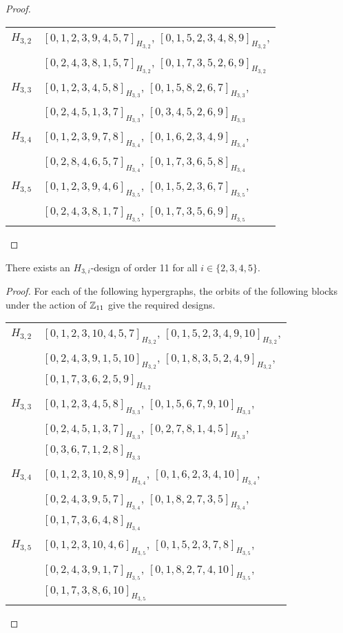 \begin{subappendices}
\begin{proof}
\begin{tabular}{|c|l|}
\hline
$H_{3,2}$ &
  $[0, 1, 2, 3, 9, 4, 5, 7]_{H_{3,2}}$,
  $[0, 1, 5, 2, 3, 4, 8, 9]_{H_{3,2}}$, \\ &
  $[0, 2, 4, 3, 8, 1, 5, 7]_{H_{3,2}}$,
  $[0, 1, 7, 3, 5, 2, 6, 9]_{H_{3,2}}$
\\ \hline
$H_{3,3}$ &
  $[0, 1, 2, 3, 4, 5, 8]_{H_{3,3}}$,
  $[0, 1, 5, 8, 2, 6, 7]_{H_{3,3}}$, \\ &
  $[0, 2, 4, 5, 1, 3, 7]_{H_{3,3}}$,
  $[0, 3, 4, 5, 2, 6, 9]_{H_{3,3}}$
\\ \hline
$H_{3,4}$ &
  $[0, 1, 2, 3, 9, 7, 8]_{H_{3,4}}$,
  $[0, 1, 6, 2, 3, 4, 9]_{H_{3,4}}$, \\ &
  $[0, 2, 8, 4, 6, 5, 7]_{H_{3,4}}$,
  $[0, 1, 7, 3, 6, 5, 8]_{H_{3,4}}$
\\ \hline
$H_{3,5}$ &
  $[0, 1, 2, 3, 9, 4, 6]_{H_{3,5}}$,
  $[0, 1, 5, 2, 3, 6, 7]_{H_{3,5}}$, \\ &
  $[0, 2, 4, 3, 8, 1, 7]_{H_{3,5}}$,
  $[0, 1, 7, 3, 5, 6, 9]_{H_{3,5}}$
\\ \hline
\end{tabular}
\end{proof}


\begin{example} \label{eg:H_3i-11}
There exists an $H_{3,i}$-design of order 11 for all $i \in \{2,3,4,5\}$.
\end{example}

\begin{proof}
For each of the following hypergraphs, the orbits of the following blocks under
the action of $\mathbb{Z}_{11}$ give the required designs.

\begin{tabular}{|c|l|}
\hline
$H_{3,2}$ &
  $[0, 1, 2, 3, 10, 4, 5, 7]_{H_{3,2}}$,
  $[0, 1, 5, 2, 3, 4, 9, 10]_{H_{3,2}}$, \\ &
  $[0, 2, 4, 3, 9, 1, 5, 10]_{H_{3,2}}$,
  $[0, 1, 8, 3, 5, 2, 4, 9]_{H_{3,2}}$, \\ &
  $[0, 1, 7, 3, 6, 2, 5, 9]_{H_{3,2}}$
\\ \hline
$H_{3,3}$ &
  $[0, 1, 2, 3, 4, 5, 8]_{H_{3,3}}$,
  $[0, 1, 5, 6, 7, 9, 10]_{H_{3,3}}$, \\ &
  $[0, 2, 4, 5, 1, 3, 7]_{H_{3,3}}$,
  $[0, 2, 7, 8, 1, 4, 5]_{H_{3,3}}$, \\ &
  $[0, 3, 6, 7, 1, 2, 8]_{H_{3,3}}$
\\ \hline
$H_{3,4}$ &
  $[0, 1, 2, 3, 10, 8, 9]_{H_{3,4}}$,
  $[0, 1, 6, 2, 3, 4, 10]_{H_{3,4}}$, \\ &
  $[0, 2, 4, 3, 9, 5, 7]_{H_{3,4}}$,
  $[0, 1, 8, 2, 7, 3, 5]_{H_{3,4}}$, \\ &
  $[0, 1, 7, 3, 6, 4, 8]_{H_{3,4}}$
\\ \hline
$H_{3,5}$ &
  $[0, 1, 2, 3, 10, 4, 6]_{H_{3,5}}$,
  $[0, 1, 5, 2, 3, 7, 8]_{H_{3,5}}$, \\ &
  $[0, 2, 4, 3, 9, 1, 7]_{H_{3,5}}$,
  $[0, 1, 8, 2, 7, 4, 10]_{H_{3,5}}$, \\ &
  $[0, 1, 7, 3, 8, 6, 10]_{H_{3,5}}$
\\ \hline
\end{tabular}
\end{proof}



\end{subappendices}
